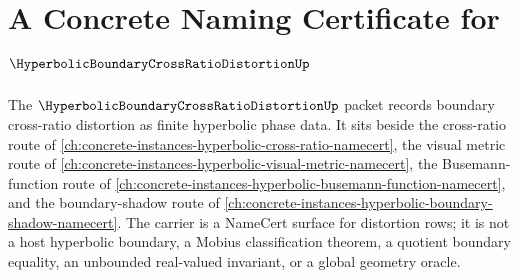 \chapter{A Concrete Naming Certificate for $\HyperbolicBoundaryCrossRatioDistortionUp$}
\label{ch:concrete-instances-hyperbolic-boundary-cross-ratio-distortion-namecert}

The $\HyperbolicBoundaryCrossRatioDistortionUp$ packet records boundary cross-ratio distortion as finite hyperbolic phase data. It sits beside the cross-ratio route of \autoref{ch:concrete-instances-hyperbolic-cross-ratio-namecert}, the visual metric route of \autoref{ch:concrete-instances-hyperbolic-visual-metric-namecert}, the Busemann-function route of \autoref{ch:concrete-instances-hyperbolic-busemann-function-namecert}, and the boundary-shadow route of \autoref{ch:concrete-instances-hyperbolic-boundary-shadow-namecert}. The carrier is a NameCert surface for distortion rows; it is not a host hyperbolic boundary, a Mobius classification theorem, a quotient boundary equality, an unbounded real-valued invariant, or a global geometry oracle.

